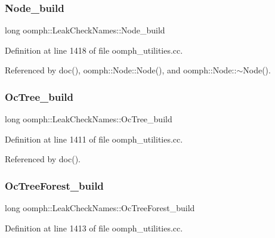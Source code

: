 \subsubsection{\texorpdfstring{Node\+\_\+build}{Node\_build}}
{\footnotesize\ttfamily long oomph\+::\+Leak\+Check\+Names\+::\+Node\+\_\+build}



Definition at line 1418 of file oomph\+\_\+utilities.\+cc.



Referenced by doc(), oomph\+::\+Node\+::\+Node(), and oomph\+::\+Node\+::$\sim$\+Node().

\mbox{\label{namespaceoomph_1_1LeakCheckNames_ae550f6949511aa03ea98188eca2ad49e}} 
\subsubsection{\texorpdfstring{Oc\+Tree\+\_\+build}{OcTree\_build}}
{\footnotesize\ttfamily long oomph\+::\+Leak\+Check\+Names\+::\+Oc\+Tree\+\_\+build}



Definition at line 1411 of file oomph\+\_\+utilities.\+cc.



Referenced by doc().

\mbox{\label{namespaceoomph_1_1LeakCheckNames_a8f27a2ceb410044d17f59cdcd362358d}} 
\subsubsection{\texorpdfstring{Oc\+Tree\+Forest\+\_\+build}{OcTreeForest\_build}}
{\footnotesize\ttfamily long oomph\+::\+Leak\+Check\+Names\+::\+Oc\+Tree\+Forest\+\_\+build}



Definition at line 1413 of file oomph\+\_\+utilities.\+cc.



